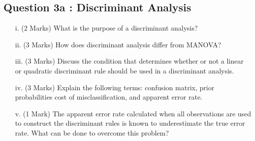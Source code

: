 \documentclass[a4paper,12pt]{article}
\begin{document}

\newpage
\subsection*{Question 3a : Discriminant Analysis} %

\begin{itemize}
\item[i.](2 Marks) What is the purpose of a discriminant analysis?
\item[ii.](3 Marks) How does discriminant analysis differ from MANOVA?
\item[iii.](3 Marks)	Discuss the condition that determines whether or not a linear or quadratic discriminant rule should be used in a discriminant analysis.
%


\item[iv.](3 Marks)	Explain the following terms:  confusion matrix,  prior probabilities cost of misclassification, and apparent error rate.

\item[v.](1 Mark)	The apparent error rate calculated when all observations are used to construct the discriminant rules is known to underestimate the true error rate.  What can be done to overcome this problem?
\end{itemize}
\end{document}
